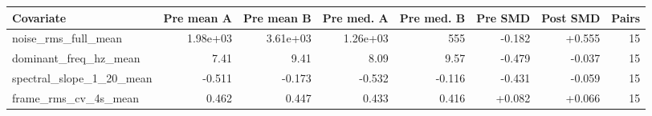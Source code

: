 \begin{tabular}{lrrrrrrr}
\toprule
Covariate & Pre mean A & Pre mean B & Pre med. A & Pre med. B & Pre SMD & Post SMD & Pairs \\
\midrule
noise\_rms\_full\_mean & 1.98e+03 & 3.61e+03 & 1.26e+03 & 555 & -0.182 & +0.555 & 15 \\
dominant\_freq\_hz\_mean & 7.41 & 9.41 & 8.09 & 9.57 & -0.479 & -0.037 & 15 \\
spectral\_slope\_1\_20\_mean & -0.511 & -0.173 & -0.532 & -0.116 & -0.431 & -0.059 & 15 \\
frame\_rms\_cv\_4s\_mean & 0.462 & 0.447 & 0.433 & 0.416 & +0.082 & +0.066 & 15 \\
\bottomrule
\end{tabular}
